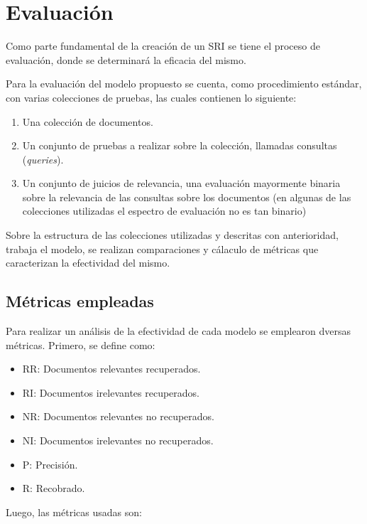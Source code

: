 \section{Evaluación}\label{sec:eval}

Como parte fundamental de la creación de un SRI se tiene el proceso de
evaluación, donde se determinará la eficacia del mismo.

Para la evaluación del modelo propuesto se cuenta, como procedimiento estándar,
con varias colecciones de pruebas, las cuales contienen lo siguiente:

\begin{enumerate}
    \item Una colección de documentos.
    \item Un conjunto de pruebas a realizar sobre la colección, llamadas
    consultas (\emph{queries}).
    \item Un conjunto de juicios de relevancia, una evaluación mayormente
    binaria sobre la relevancia de las consultas sobre los documentos (en
    algunas de las colecciones utilizadas el espectro de evaluación no es tan
    binario) 
\end{enumerate}

Sobre la estructura de las colecciones utilizadas y descritas con anterioridad,
trabaja el modelo, se realizan comparaciones y cálaculo de métricas que
caracterizan la efectividad del mismo.

\subsection{Métricas empleadas}\label{sec:metrics}

Para realizar un análisis de la efectividad de cada modelo se emplearon 
dversas métricas. Primero, se define como:

\begin{itemize}
	\item RR: Documentos relevantes recuperados.
	\item RI: Documentos irelevantes recuperados.
	\item NR: Documentos relevantes no recuperados.
	\item NI: Documentos irelevantes no recuperados.
	\item P: Precisión.
	\item R: Recobrado.
\end{itemize}

Luego, las métricas usadas son:

